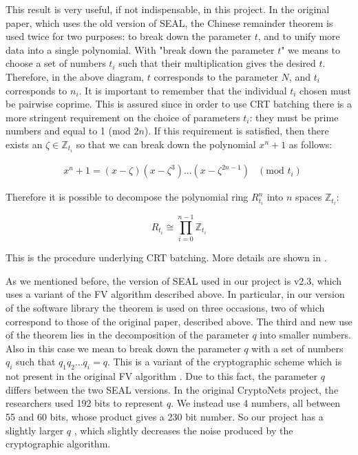 This result is very useful, if not indispensable, in this project. In the original paper, which uses the old version of SEAL, the Chinese remainder theorem is used twice for two purposes: to break down the parameter $t$, and to unify more data into a single polynomial. With "break down the parameter $t$" we means to choose a set of numbers $t_i$ such that their multiplication gives the desired $t$. Therefore, in the above diagram, $t$ corresponds to the parameter $N$, and $t_i$ corresponds to $n_i$. It is important to remember that the individual $t_i$ chosen must be pairwise coprime. This is assured since in order to use CRT batching there is a more stringent requirement on the choice of parameters $t_i$: they must be prime numbers and equal to 1 (mod $2n$). If this requirement is satisfied, then there exists an $\zeta \in \mathbb{Z}_{t_i}$ so that we can break down the polynomial $x^n+1$ as follows:

\begin{align*}
    &x^n+1 = (x - \zeta)(x - \zeta^3)...(x - \zeta^{2n-1}) & (\text{mod }t_i)
\end{align*}

Therefore it is possible to decompose the polynomial ring $R^n_{t_i}$ into $n$ spaces $\mathbb{Z}_{t_i}$:

\begin{equation*}
    R_{t_i} \cong \prod \limits_{i=0}^{n-1} \mathbb{Z}_{t_i}
\end{equation*}

This is the procedure underlying CRT batching. More details are shown in \cite{seal-manual}.

As we mentioned before, the version of SEAL used in our project is v2.3, which uses a variant of the FV algorithm described above. In particular, in our version of the software library the theorem is used on three occasions, two of which correspond to those of the original paper, described above. The third and new use of the theorem lies in the decomposition of the parameter $q$ into smaller numbers. Also in this case we mean to break down the parameter $q$ with a set of numbers $q_i$ such that $q_1q_2...q_i = q$. This is a variant of the cryptographic scheme which is not present in the original FV algorithm \cite{Fan2012SomewhatPF}. Due to this fact, the parameter $q$ differs between the two SEAL versions. In the original CryptoNets project, the researchers used 192 bits to represent $q$. We instead use 4 numbers, all between 55 and 60 bits, whose product gives a 230 bit number. So our project has a slightly larger $q$
, which slightly decreases the noise produced by the cryptographic algorithm.

